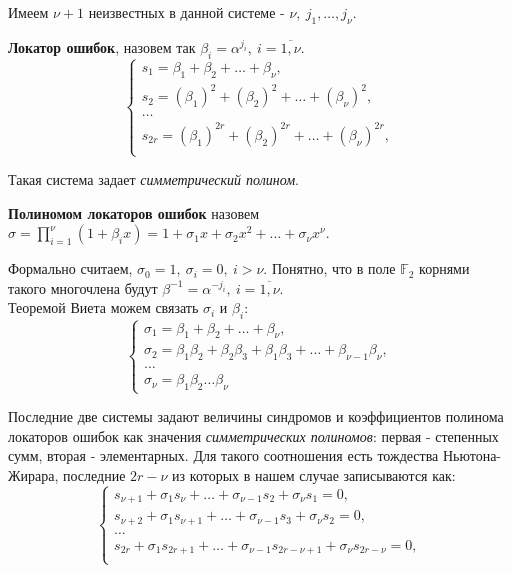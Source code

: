 Имеем $\nu + 1$ неизвестных в данной системе - $\nu,~j_1,\ldots,j_\nu$.

\textbf{Локатор ошибок}, назовем так
$\beta_i = \alpha^{j_i},~i = \overline{1,\nu}$.
\begin{equation*}\begin{cases}
  s_1 = \beta_{1} + \beta_{2} + \ldots + \beta_{\nu},\\
  s_2 = (\beta_{1})^{2} + (\beta_{2})^{2} + \ldots + (\beta_{\nu})^{2},\\
  \dots\\
  s_{2r} = (\beta_{1})^{2r} + (\beta_{2})^{2r} + \ldots + (\beta_{\nu})^{2r},\\
\end{cases}\end{equation*}

Такая система задает \textit{симметрический полином}.

\textbf{Полиномом локаторов ошибок} назовем
$ \sigma = \prod\limits_{i=1}^{\nu} (1 + \beta_i x) =
1 + \sigma_1 x + \sigma_2 x^2 + \dots + \sigma_\nu x^\nu $.

Формально считаем, $\sigma_0 = 1,~\sigma_i = 0,~i > \nu$. Понятно, что в поле
$\mathbb{F}_2$ корнями такого многочлена будут
$\beta^{-1} = \alpha^{-j_i},~i = \overline{1, \nu}$.\\

Теоремой Виета можем связать $\sigma_i$ и $\beta_i$:
\begin{equation*}\begin{cases}
  \sigma_1 = \beta_{1} + \beta_{2} + \ldots + \beta_{\nu},\\
  \sigma_2 = \beta_1\beta_2 + \beta_2\beta_3 + \beta_1\beta_3
    + \ldots + \beta_{\nu-1}\beta_\nu,\\
  \dots\\
  \sigma_\nu = \beta_1\beta_2\ldots\beta_\nu
\end{cases}\end{equation*}

Последние две системы задают величины синдромов и коэффициентов полинома
локаторов ошибок как значения \textit{симметрических полиномов}: первая - степенных
сумм, вторая - элементарных. Для такого соотношения есть тождества
Ньютона-Жирара, последние $2r - \nu$ из которых в нашем случае записываются как:
\begin{equation*}\begin{cases}
  s_{\nu+1} + \sigma_1s_\nu + \dots + \sigma_{\nu-1}s_2 + \sigma_\nu s_1 = 0,\\
  s_{\nu+2} + \sigma_1s_{\nu + 1} + \dots + \sigma_{\nu-1}s_3 + \sigma_\nu s_2 = 0,\\
  \dots\\
  s_{2r} + \sigma_1s_{2r+1} + \dots + \sigma_{\nu-1}s_{2r-\nu+1} + \sigma_\nu s_{2r - \nu} = 0,\\
\end{cases}\end{equation*}

